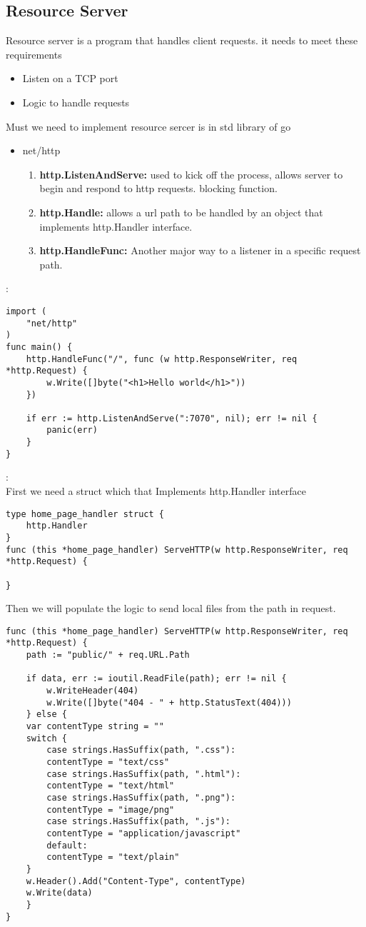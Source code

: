 \subsection{Resource Server}
Resource server is a program that handles client requests. it needs to meet these requirements
\begin{itemize}
	\item Listen on a TCP port
	\item Logic to handle requests
\end{itemize}
Must we need to implement resource sercer is in std library of go
\begin{itemize}
	\item net/http
	\begin{enumerate}
		\item \textbf{http.ListenAndServe:} used to kick off the process, allows server to begin and respond to http requests. blocking function.
		\item \textbf{http.Handle:} allows a url path to be handled by an object that implements http.Handler interface.
		\item \textbf{http.HandleFunc:} Another major way to a listener in a specific request path.
	\end{enumerate}
\end{itemize}
\begin{note}:
\begin{lstlisting}[language=Golang]
import (
	"net/http"	
)
func main() {
	http.HandleFunc("/", func (w http.ResponseWriter, req *http.Request) {
		w.Write([]byte("<h1>Hello world</h1>"))
	})

	if err := http.ListenAndServe(":7070", nil); err != nil {
		panic(err)
	}
}
\end{lstlisting}
\end{note}
\begin{note}:\\
First we need a struct which that Implements http.Handler interface
\begin{lstlisting}[language=Golang]
type home_page_handler struct {
	http.Handler
}
func (this *home_page_handler) ServeHTTP(w http.ResponseWriter, req *http.Request) {

}
\end{lstlisting}
Then we will populate the logic to send local files from the path in request.
\begin{lstlisting}[language=Golang]
func (this *home_page_handler) ServeHTTP(w http.ResponseWriter, req *http.Request) {
	path := "public/" + req.URL.Path
	
	if data, err := ioutil.ReadFile(path); err != nil {
		w.WriteHeader(404)
		w.Write([]byte("404 - " + http.StatusText(404)))
	} else {
	var contentType string = ""
	switch {
		case strings.HasSuffix(path, ".css"):
		contentType = "text/css"
		case strings.HasSuffix(path, ".html"):
		contentType = "text/html"
		case strings.HasSuffix(path, ".png"):
		contentType = "image/png"
		case strings.HasSuffix(path, ".js"):
		contentType = "application/javascript"
		default:
		contentType = "text/plain"
	}
	w.Header().Add("Content-Type", contentType)
	w.Write(data)
	}
}
\end{lstlisting}
\end{note}
